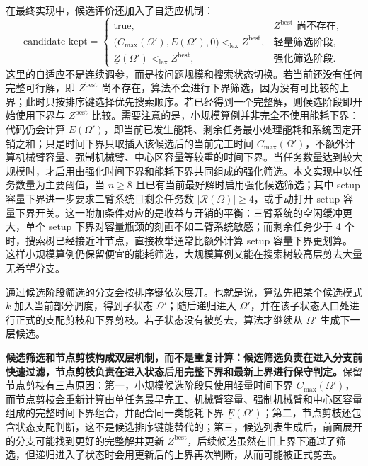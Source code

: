 在最终实现中，候选评价还加入了自适应机制：
\[
    \text{candidate kept} =
    \begin{cases}
        \text{true},
        & Z^{\mathrm{best}}\text{ 尚不存在},\\
        \bigl(C_{\max}(\Omega'),\underline E(\Omega'),0\bigr)
        <_{\mathrm{lex}} Z^{\mathrm{best}},
        & \text{轻量筛选阶段},\\
        \underline Z(\Omega') <_{\mathrm{lex}} Z^{\mathrm{best}},
        & \text{强化筛选阶段}.
    \end{cases}
\]
这里的自适应不是连续调参，而是按问题规模和搜索状态切换。若当前还没有任何完整可行解，即 $Z^{\mathrm{best}}$ 尚不存在，算法不会进行下界筛选，因为没有可比较的上界；此时只按排序键选择优先搜索顺序。若已经得到一个完整解，则候选阶段即开始使用下界与 $Z^{\mathrm{best}}$ 比较。需要注意的是，小规模算例并非完全不使用能耗下界：代码仍会计算 $\underline E(\Omega')$，即当前已发生能耗、剩余任务最小处理能耗和系统固定开销之和；只是时间下界只取插入该候选后的当前完工时间 $C_{\max}(\Omega')$，不额外计算机械臂容量、强制机械臂、中心区容量等较重的时间下界。当任务数量达到较大规模时，才启用由强化时间下界和能耗下界共同组成的强化筛选。本文实现中以任务数量为主要阈值，当 $n\ge 8$ 且已有当前最好解时启用强化候选筛选；其中 setup 容量下界进一步要求二臂系统且剩余任务数 $|\mathcal{R}(\Omega)|\ge 4$，或手动打开 setup 容量下界开关。这一附加条件对应的是收益与开销的平衡：三臂系统的空闲缓冲更大，单个 setup 下界对容量瓶颈的刻画不如二臂系统敏感；而剩余任务少于 4 个时，搜索树已经接近叶节点，直接枚举通常比额外计算 setup 容量下界更划算。这样小规模算例仍保留便宜的能耗筛选，大规模算例又能在搜索树较高层剪去大量无希望分支。

通过候选阶段筛选的分支会按排序键依次展开。也就是说，算法先把某个候选模式 $k$ 加入当前部分调度，得到子状态 $\Omega'$；随后递归进入 $\Omega'$，并在该子状态入口处进行正式的支配剪枝和下界剪枝。若子状态没有被剪去，算法才继续从 $\Omega'$ 生成下一层候选。

\textbf{候选筛选和节点剪枝构成双层机制，而不是重复计算：候选筛选负责在进入分支前快速过滤，节点剪枝负责在进入状态后用完整下界和最新上界进行保守判定。}保留节点剪枝有三点原因：第一，小规模候选阶段只使用轻量时间下界 $C_{\max}(\Omega')$，而节点剪枝会重新计算由单任务最早完工、机械臂容量、强制机械臂和中心区容量组成的完整时间下界组合，并配合同一类能耗下界 $\underline E(\Omega')$；第二，节点剪枝还包含状态支配判断，这不是候选排序键能替代的；第三，候选列表生成后，前面展开的分支可能找到更好的完整解并更新 $Z^{\mathrm{best}}$，后续候选虽然在旧上界下通过了筛选，但递归进入子状态时会用更新后的上界再次判断，从而可能被正式剪去。

